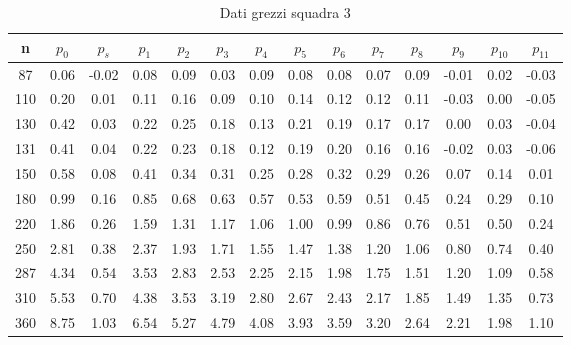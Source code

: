 \begin{table}[H]
    \centering
    \begin{tabular}{|c|c|c|c|c|c|c|c|c|c|c|c|c|c|}
    \hline
    n   & $p_0$ & $p_s$ & $p_1$ & $p_2$ & $p_3$ & $p_4$ & $p_5$ & $p_6$ & $p_7$ & $p_8$ & $p_9$ & $p_{10}$ & $p_{11}$ \\ \hline
    87  & 0.06  & -0.02  & 0.08  & 0.09  & 0.03  & 0.09  & 0.08  & 0.08  & 0.07  & 0.09  & -0.01 & 0.02     & -0.03    \\ \hline
    110 & 0.20  & 0.01   & 0.11  & 0.16  & 0.09  & 0.10  & 0.14  & 0.12  & 0.12  & 0.11  & -0.03 & 0.00     & -0.05    \\ \hline
    130 & 0.42  & 0.03   & 0.22  & 0.25  & 0.18  & 0.13  & 0.21  & 0.19  & 0.17  & 0.17  & 0.00  & 0.03     & -0.04    \\ \hline
    131 & 0.41  & 0.04   & 0.22  & 0.23  & 0.18  & 0.12  & 0.19  & 0.20  & 0.16  & 0.16  & -0.02 & 0.03     & -0.06    \\ \hline
    150 & 0.58  & 0.08   & 0.41  & 0.34  & 0.31  & 0.25  & 0.28  & 0.32  & 0.29  & 0.26  & 0.07  & 0.14     & 0.01     \\ \hline
    180 & 0.99  & 0.16   & 0.85  & 0.68  & 0.63  & 0.57  & 0.53  & 0.59  & 0.51  & 0.45  & 0.24  & 0.29     & 0.10     \\ \hline
    220 & 1.86  & 0.26   & 1.59  & 1.31  & 1.17  & 1.06  & 1.00  & 0.99  & 0.86  & 0.76  & 0.51  & 0.50     & 0.24     \\ \hline
    250 & 2.81  & 0.38   & 2.37  & 1.93  & 1.71  & 1.55  & 1.47  & 1.38  & 1.20  & 1.06  & 0.80  & 0.74     & 0.40     \\ \hline
    287 & 4.34  & 0.54   & 3.53  & 2.83  & 2.53  & 2.25  & 2.15  & 1.98  & 1.75  & 1.51  & 1.20  & 1.09     & 0.58     \\ \hline
    310 & 5.53  & 0.70   & 4.38  & 3.53  & 3.19  & 2.80  & 2.67  & 2.43  & 2.17  & 1.85  & 1.49  & 1.35     & 0.73     \\ \hline
    360 & 8.75  & 1.03   & 6.54  & 5.27  & 4.79  & 4.08  & 3.93  & 3.59  & 3.20  & 2.64  & 2.21  & 1.98     & 1.10     \\ \hline
    \end{tabular}
    \caption{Dati grezzi squadra 3}
\end{table}

